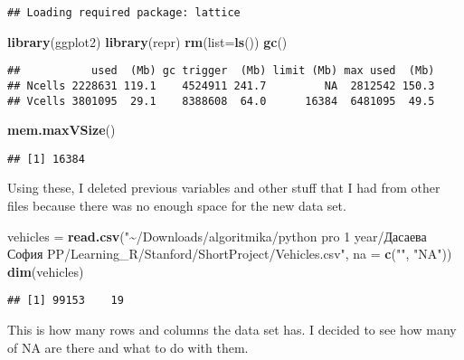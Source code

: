 \documentclass[
]{article}
\newenvironment{Shaded}{\begin{snugshade}}{\end{snugshade}}
\newcommand{\AttributeTok}[1]{\textcolor[rgb]{0.13,0.29,0.53}{#1}}
\newcommand{\FunctionTok}[1]{\textcolor[rgb]{0.13,0.29,0.53}{\textbf{#1}}}
\newcommand{\NormalTok}[1]{#1}
\newcommand{\OtherTok}[1]{\textcolor[rgb]{0.56,0.35,0.01}{#1}}
\newcommand{\StringTok}[1]{\textcolor[rgb]{0.31,0.60,0.02}{#1}}
\begin{document}
\begin{verbatim}
## Loading required package: lattice
\end{verbatim}

\begin{Shaded}
\begin{Highlighting}[]
\FunctionTok{library}\NormalTok{(ggplot2)}
\FunctionTok{library}\NormalTok{(repr) }
\FunctionTok{rm}\NormalTok{(}\AttributeTok{list=}\FunctionTok{ls}\NormalTok{())}
\FunctionTok{gc}\NormalTok{()}
\end{Highlighting}
\end{Shaded}

\begin{verbatim}
##           used  (Mb) gc trigger  (Mb) limit (Mb) max used  (Mb)
## Ncells 2228631 119.1    4524911 241.7         NA  2812542 150.3
## Vcells 3801095  29.1    8388608  64.0      16384  6481095  49.5
\end{verbatim}

\begin{Shaded}
\begin{Highlighting}[]
\FunctionTok{mem.maxVSize}\NormalTok{()}
\end{Highlighting}
\end{Shaded}

\begin{verbatim}
## [1] 16384
\end{verbatim}

Using these, I deleted previous variables and other stuff that I had
from other files because there was no enough space for the new data set.

\begin{Shaded}
\begin{Highlighting}[]
\NormalTok{vehicles }\OtherTok{=} \FunctionTok{read.csv}\NormalTok{(}\StringTok{"\textasciitilde{}/Downloads/algoritmika/python pro 1 year/Дасаева София PP/Learning\_R/Stanford/ShortProject/Vehicles.csv"}\NormalTok{, }\AttributeTok{na =} \FunctionTok{c}\NormalTok{(}\StringTok{""}\NormalTok{, }\StringTok{"NA"}\NormalTok{))}
\FunctionTok{dim}\NormalTok{(vehicles)}
\end{Highlighting}
\end{Shaded}

\begin{verbatim}
## [1] 99153    19
\end{verbatim}

This is how many rows and columns the data set has. I decided to see how
many of NA are there and what to do with them.
\end{document}
